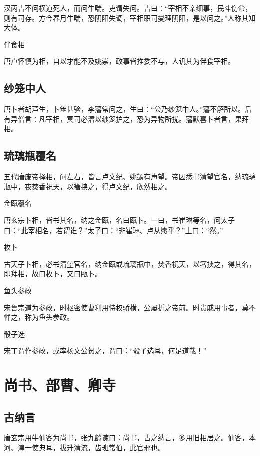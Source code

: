 \documentclass[a4paper,12pt,UTF8,twoside]{ctexbook}
\begin{document}
    汉丙吉不问横道死人，而问牛喘。吏谓失问。吉曰：“宰相不亲细事，民斗伤命，则有司存。方今春月牛喘，恐阴阳失调，宰相职司燮理阴阳，是以问之。”人称其知大体。
    
    伴食相
    
    唐卢怀慎为相，自以才能不及姚崇，政事皆推委不与，人讥其为伴食宰相。
    
    \section{纱笼中人}
    
    唐卜者胡芦生，卜筮甚验，李藩常问之，生曰：“公乃纱笼中人。”藩不解所以。后有异僧言：凡宰相，冥司必潜以纱笼护之，恐为异物所扰。藩默喜卜者言，果拜相。
    
    \section{琉璃瓶覆名}
    
    五代唐废帝择相，问左右，皆言卢文纪、姚顗有声望。帝因悉书清望官名，纳琉璃瓶中，夜焚香祝天，以箸挟之，得卢文纪，欣然相之。
    
    金瓯覆名
    
    唐玄宗卜相，皆书其名，纳之金瓯，名曰瓯卜。一曰，书崔琳等名，问太子曰：“此宰相名，若谓谁？”太子曰：“非崔琳、卢从愿乎？”上曰：“然。”
    
    枚卜
    
    古天子卜相，必书清望官名，纳金瓯或琉璃瓶中，焚香祝天，以箸挟之，得其名，即拜相，故曰枚卜，又曰瓯卜。
    
    鱼头参政
    
    宋鲁宗道为参政，时枢密使曹利用恃权骄横，公屡折之帝前。时贵戚用事者，莫不惮之，称为鱼头参政。
    
    骰子选
    
    宋丁谓作参政，或率杨文公贺之，谓曰：“骰子选耳，何足道哉！”
    
    \chapter{尚书、部曹、卿寺}
    
    \section{古纳言}
    
    唐玄宗用牛仙客为尚书，张九龄谏曰：尚书，古之纳言，多用旧相居之。仙客，本河、湟一使典耳，拔升清流，齿班常伯，此官邪也。
    
\end{document}

